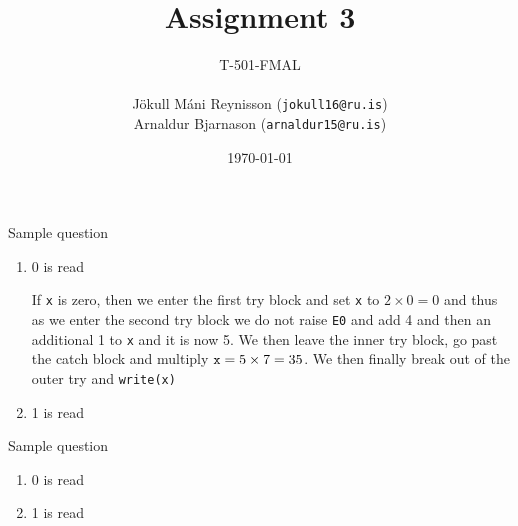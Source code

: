 \documentclass[11pt]{exam}
\begin{document}
\title{Assignment 3}
    \author{{\small T-501-FMAL} \\ \quad \\ Jökull Máni Reynisson ({\tt jokull16@ru.is}) \\  Arnaldur Bjarnason ({\tt arnaldur15@ru.is})}
\date{\today}
\maketitle

\begin{questions}


	\question Sample question

        \begin{enumerate}[label=(\roman*)]
            \item 0 is read
                \begin{framed}
                    If {\tt x} is zero, then we enter the first try block and set {\tt x} to $2\times 0 = 0$ and thus as we enter the second try block we do not raise {\tt E0} and add 4 and then an additional 1 to {\tt x} and it is now 5. We then leave the inner try block, go past the catch block and multiply ${\tt x} = 5 \times 7 = 35$. We then finally break out of the outer try and {\tt write(x)}
                \end{framed}

            \item 1 is read
                \begin{framed}
                \end{framed}
        \end{enumerate}
            



	\question Sample question

        \begin{enumerate}[label=(\alph*)]
            \item 0 is read
                \begin{framed}
                \end{framed}

            \item 1 is read
                \begin{framed}
                \end{framed}
        \end{enumerate}
 


\end{questions}
\end{document}
